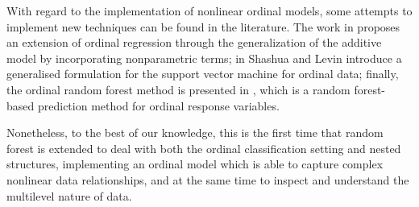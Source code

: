 With regard to the implementation of nonlinear ordinal models, some attempts to implement new techniques can be found in the literature.
The work in \cite{tutz2003generalized} proposes an extension of ordinal regression through the generalization of the additive model by incorporating nonparametric terms; in \cite{shashua2002ranking} Shashua and Levin introduce a generalised formulation for the support vector machine for ordinal data; finally, the ordinal random forest method is presented in \cite{hornung2020ordinal}, which is a random forest-based prediction method for ordinal response variables.

Nonetheless, to the best of our knowledge, this is the first time that random forest is extended to deal with both the ordinal classification setting and nested structures, implementing an ordinal model which is able to capture complex nonlinear data relationships, and at the same time to inspect and understand the multilevel nature of data.

